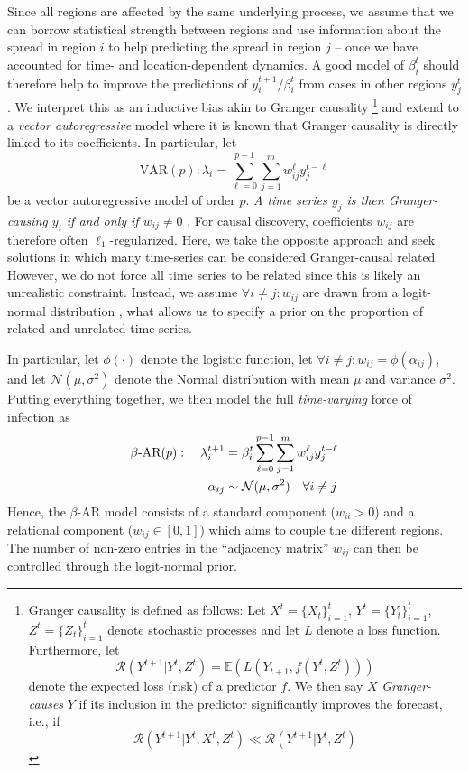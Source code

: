 \documentclass{article}
\newcommand{\AR}{\text{AR}}
\newcommand{\bAR}{\ensuremath{\beta}\text{-AR}\xspace}
\newcommand{\risk}{\mathcal{R}}
\newcommand{\foi}{\lambda}
\newcommand{\E}{\mathbb{E}}
\begin{document}
Since all regions are affected by the same underlying process, we assume that we
can borrow statistical strength between regions and use information about the
spread in region \(i\) to help predicting the spread in region \(j\) -- once we have
accounted for time- and location-dependent dynamics. A good model of \(\beta_i^t\)
should therefore help to improve the predictions of \(y_i^{t+1} / \beta_i^t\) from
cases in other regions \(y_j^t\). We interpret this as an inductive bias akin to
Granger causality \citep{granger1969investigating}\footnote{Granger causality is
defined as follows: Let \({X^t=\{X_t\}_{i=1}^t}\), \({Y^t=\{Y_t\}_{i=1}^t}\),
\({Z^t=\{Z_t\}_{i=1}^t}\) denote stochastic processes and let \(L\) denote a loss
function. Furthermore, let \[\risk(Y^{t+1} | Y^t, Z^t) = \E(L(Y_{t+1}, f(Y^t,
Z^t)))\] denote the expected loss (risk) of a predictor \(f\). We then say \(X\)
\emph{Granger-causes} \(Y\) if its inclusion in the predictor significantly improves
the forecast, i.e., if \[ \risk(Y^{t+1} | Y^t, X^t, Z^t) \ll \risk(Y^{t+1} |
Y^t, Z^t) \]} and extend  to a \emph{vector autoregressive} model where
it is known that Granger causality is directly linked to its coefficients. In
particular, let
\begin{equation} \text{VAR}(p): \foi_i =
\sum_{\ell=0}^{p-1} \sum_{j=1}^m w_{ij}^\ell y_j^{t - \ell}
\end{equation}
be a vector autoregressive model of order \(p\). \emph{A time series \(y_j\) is then
Granger-causing \(y_i\) if and only if \(w_{ij} \neq 0\)} \citep{Seth2007granger}. For
causal discovery, coefficients \(w_{ij}\) are therefore often
\(\ell_1\)-regularized. Here, we take the opposite approach and seek solutions
in which many time-series can be considered Granger-causal
related. However, we do not force all time series to be related since this is
likely an unrealistic constraint. Instead, we assume \(\forall i \neq j : w_{ij}\)
are drawn from a logit-normal distribution \citep{atchison1980logistic}, what
allows us to specify a prior on the proportion of related and unrelated time
series.


In particular, let \(\phi(\cdot)\) denote the logistic function, let \({\forall i
\neq j : w_{ij} = \phi(\alpha_{ij})}\), and let \(\mathcal{N}(\mu, \sigma^2)\)
denote the Normal distribution with mean \(\mu\) and variance \(\sigma^2\). Putting
everything together, we then model the full \emph{time-varying} force of infection as
\begin{align}
\bAR(p): \quad \foi^{t+1}_i & =
\beta_i^t \sum_{\ell=0}^{p-1}\sum_{j=1}^m w_{ij}^\ell y_j^{t - \ell} \label{eq:beta-ar} \\
    \alpha_{ij} & \sim \mathcal{N}(\mu, \sigma^2) \quad \forall i \neq j \notag
\end{align}
Hence, the \(\bAR\) model consists of a standard \AR\xspace component (\(w_{ii} > 0\)) and
a relational component (\(w_{ij} \in [0, 1]\)) which aims to couple the different
regions. The number of non-zero entries in the ``adjacency matrix'' \(w_{ij}\) can
then be controlled through the logit-normal prior.
\end{document}
